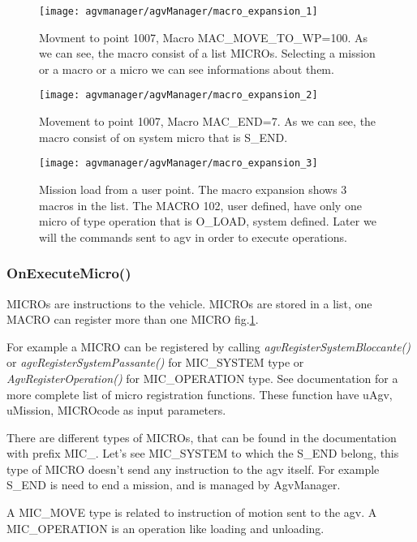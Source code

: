 \begin{figure}
	\centering\texttt{[image: agvmanager/agvManager/macro\_expansion\_1]}
	\caption{Movment to point 1007, Macro MAC\_MOVE\_TO\_WP=100. As we can see, the macro consist of a list MICROs. Selecting a mission or a macro or a micro we can see informations about them.}
	\label{fig:macro_expansion_1}
\end{figure}
\begin{figure}
	\centering\texttt{[image: agvmanager/agvManager/macro\_expansion\_2]}
	\caption{Movement to point 1007, Macro MAC\_END=7. As we can see, the macro consist of on system micro that is S\_END.}
	\label{fig:macro_expansion_2}
\end{figure}
\begin{figure}
	\centering\texttt{[image: agvmanager/agvManager/macro\_expansion\_3]}
	\caption{Mission load from a user point. The macro expansion shows 3 macros in the list. The MACRO 102, user defined, have only one micro of type operation that is O\_LOAD, system defined. Later we will the commands sent to agv in order to execute operations.}
	\label{fig:macro_expansion_3}
\end{figure}



\subsubsection{OnExecuteMicro()}

MICROs are instructions to the vehicle. MICROs are stored in a list, one MACRO can register more than one MICRO fig.\ref{fig:macro_expansion_1}.

For example a MICRO can be registered by calling \textit{agvRegisterSystemBloccante()} or  \textit{agvRegisterSystemPassante()} for MIC\_SYSTEM type or \textit{AgvRegisterOperation()} for MIC\_OPERATION type. See documentation for a more complete list of micro registration functions.
These function have uAgv, uMission, MICROcode as input parameters.

There are different types of MICROs, that can be found in the documentation with prefix MIC\_. Let's see MIC\_SYSTEM to which the S\_END belong, this type of MICRO doesn't send any instruction to the agv itself. For example S\_END is need to end a mission, and is managed by AgvManager.

A MIC\_MOVE type is related to instruction of motion sent to the agv. A MIC\_OPERATION is an operation like loading and unloading. \\

